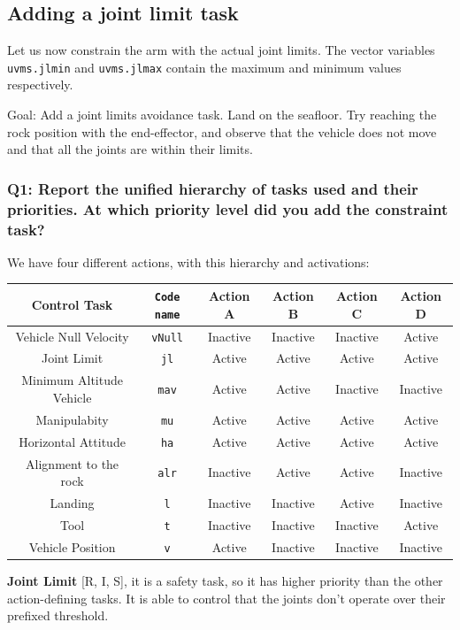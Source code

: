 \documentclass{article}
\newcommand{\ocio} {\marginpar{!}}
\begin{document}
\subsection{Adding a joint limit task}
Let us now constrain the arm with the actual joint limits. The vector variables \texttt{uvms.jlmin} and \texttt{uvms.jlmax} contain the maximum and minimum values respectively.

Goal: Add a joint limits avoidance task. Land on the seafloor. Try reaching the rock position with the end-effector, and observe that the vehicle does not move and that all the joints are within their limits.

\subsubsection{Q1: Report the unified hierarchy of tasks used and their priorities. At which priority level did you add the constraint task?}
We have four different actions, with this hierarchy and activations:
\begin{center}
\begin{tabular}{ | c | c | c | c | c | c |}
\hline
 Control Task & \texttt{Code name} & Action A & Action B & Action C & Action D\\
 \hline
 Vehicle Null Velocity & \texttt{vNull} & Inactive & Inactive & Inactive & Active\\
 Joint Limit & \texttt{jl} & Active & Active & Active & Active \\
 Minimum Altitude Vehicle &  \texttt{mav} & Active & Active & Inactive & Inactive \\  
 Manipulabity &  \texttt{mu} & Active & Active & Active & Active  \\
 Horizontal Attitude &  \texttt{ha} & Active & Active & Active & Active\\
 Alignment to the rock & \texttt{alr} & Inactive & Active & Active & Inactive \\
 Landing & \texttt{l} &Inactive & Inactive & Active & Inactive\\
 Tool  &  \texttt{t} & Inactive & Inactive & Inactive & Active\\
 Vehicle Position &  \texttt{v} &Active & Inactive & Inactive & Inactive\\
 \hline
\end{tabular}
\end{center}

\begin{description}
\item \textbf{Joint Limit} [R, I, S], it is a safety task, so it has higher priority than the other action-defining tasks. It is able to control that the joints don't operate over their prefixed threshold. \ocio
\end{description}
\end{document}

